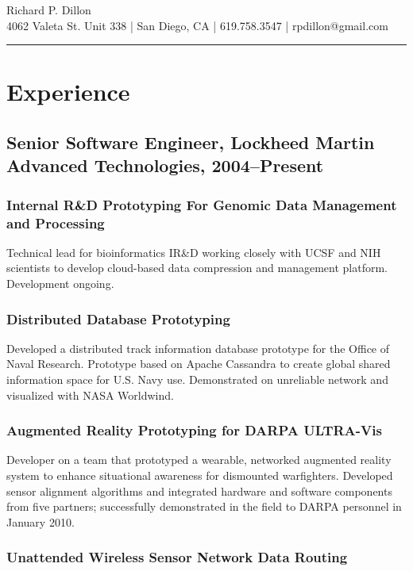 \documentclass[11pt]{article}
\title{}
\date{}
\begin{document}
\begin{center}
{\huge Richard P. Dillon} \\
4062 Valeta St. Unit 338 | San Diego, CA | 619.758.3547 | rpdillon@gmail.com
\hrule
\end{center}

\section*{Experience}
\label{sec-1}
\subsection*{Senior Software Engineer, Lockheed Martin Advanced Technologies, 2004--Present}
\label{sec-1_1}
\subsubsection*{Internal R\&D Prototyping For Genomic Data Management and Processing}
\label{sec-1_1_1}

    Technical lead for bioinformatics IR\&D working closely with
    UCSF and NIH scientists to develop cloud-based data
    compression and management platform.  Development ongoing.
\subsubsection*{Distributed Database Prototyping}
\label{sec-1_1_2}

    Developed a distributed track information database prototype for
    the Office of Naval Research. Prototype based on Apache Cassandra
    to create global shared information space for U.S. Navy use.
    Demonstrated on unreliable network and visualized with NASA
    Worldwind.
      
\subsubsection*{Augmented Reality Prototyping for DARPA ULTRA-Vis}
\label{sec-1_1_3}

    Developer on a team that prototyped a wearable, networked
    augmented reality system to enhance situational awareness for
    dismounted warfighters.  Developed sensor alignment algorithms and
    integrated hardware and software components from five partners;
    successfully demonstrated in the field to DARPA personnel in
    January 2010.
      
\subsubsection*{Unattended Wireless Sensor Network Data Routing}
\label{sec-1_1_4}
\end{document}
